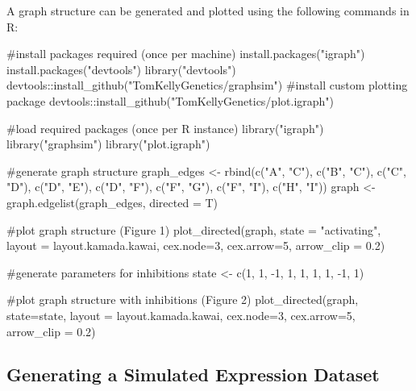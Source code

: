 \documentclass[article, shortnames]{jss}
\begin{document}
A graph structure can be generated and plotted using the following commands in R:


\begin{CodeChunk}
\begin{CodeInput}
#install packages required (once per machine)
install.packages("igraph")
install.packages("devtools")
library("devtools")
devtools::install\_github("TomKellyGenetics/graphsim")
#install custom plotting package
devtools::install\_github("TomKellyGenetics/plot.igraph")
\end{CodeInput}
\end{CodeChunk}

\begin{CodeChunk}
\begin{CodeInput}
#load required packages (once per R instance)
library("igraph")
library("graphsim")
library("plot.igraph")
\end{CodeInput}
\end{CodeChunk}

\begin{CodeChunk}
\begin{CodeInput}
#generate graph structure
graph\_edges <- rbind(c("A", "C"), c("B", "C"), c("C", "D"), c("D", "E"), 
    c("D", "F"), c("F", "G"), c("F", "I"), c("H", "I"))
graph <- graph.edgelist(graph\_edges, directed = T)

#plot graph structure (Figure 1)
plot\_directed(graph, state = "activating", layout = layout.kamada.kawai, 
    cex.node=3, cex.arrow=5, arrow\_clip = 0.2)
\end{CodeInput}
\end{CodeChunk}

\begin{CodeChunk}
\begin{CodeInput}
#generate parameters for inhibitions
state <-  c(1, 1, -1, 1, 1, 1, 1, -1, 1)

#plot graph structure with inhibitions (Figure 2)
plot\_directed(graph, state=state,  layout = layout.kamada.kawai, 
    cex.node=3, cex.arrow=5, arrow\_clip = 0.2)
\end{CodeInput}
\end{CodeChunk}



\subsection{Generating a Simulated Expression Dataset} \label{sec:graphsim_demo}
\end{document}
